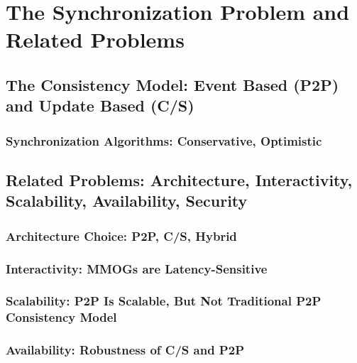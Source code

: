 \documentclass{article}
\begin{document}
\section{The Synchronization Problem and Related Problems}
\label{dfsync}

\subsection{The Consistency Model: Event Based (P2P) and Update Based (C/S)}

\subsubsection{Synchronization Algorithms: Conservative, Optimistic}

\subsection{Related Problems: Architecture, Interactivity, Scalability, Availability, Security}

\subsubsection{Architecture Choice: P2P, C/S, Hybrid}

\subsubsection{Interactivity: MMOGs are Latency-Sensitive}

\subsubsection{Scalability: P2P Is Scalable, But Not Traditional P2P Consistency Model}

\subsubsection{Availability: Robustness of C/S and P2P}
\end{document}
